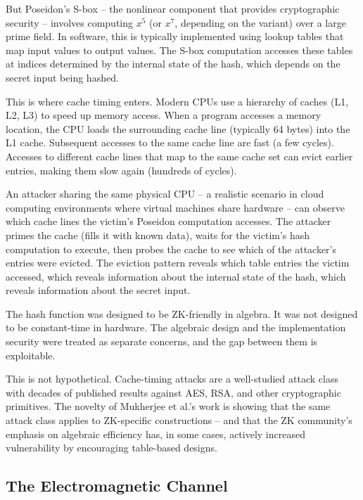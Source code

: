 \documentclass[
  11pt,
  openany]{report}
\begin{document}
But Poseidon's S-box -- the nonlinear component that provides cryptographic
security -- involves computing \(x^5\) (or \(x^7\), depending on the variant)
over a large prime field. In software, this is typically implemented using
lookup tables that map input values to output values. The S-box computation
accesses these tables at indices determined by the internal state of the hash,
which depends on the secret input being hashed.

This is where cache timing enters. Modern CPUs use a hierarchy of caches (L1,
L2, L3) to speed up memory access. When a program accesses a memory location,
the CPU loads the surrounding cache line (typically 64 bytes) into the L1 cache.
Subsequent accesses to the same cache line are fast (a few cycles). Accesses to
different cache lines that map to the same cache set can evict earlier entries,
making them slow again (hundreds of cycles).

An attacker sharing the same physical CPU -- a realistic scenario in cloud
computing environments where virtual machines share hardware -- can observe
which cache lines the victim's Poseidon computation accesses. The attacker
primes the cache (fills it with known data), waits for the victim's hash
computation to execute, then probes the cache to see which of the attacker's
entries were evicted. The eviction pattern reveals which table entries the
victim accessed, which reveals information about the internal state of the hash,
which reveals information about the secret input.

The hash function was designed to be ZK-friendly in algebra. It was not designed
to be constant-time in hardware. The algebraic design and the implementation
security were treated as separate concerns, and the gap between them is
exploitable.

This is not hypothetical. Cache-timing attacks are a well-studied attack class
with decades of published results against AES, RSA, and other cryptographic
primitives. The novelty of Mukherjee et al.'s work is showing that the same
attack class applies to ZK-specific constructions -- and that the ZK community's
emphasis on algebraic efficiency has, in some cases, actively increased
vulnerability by encouraging table-based designs.

\subsection{The Electromagnetic Channel}\label{the-electromagnetic-channel}
\end{document}
